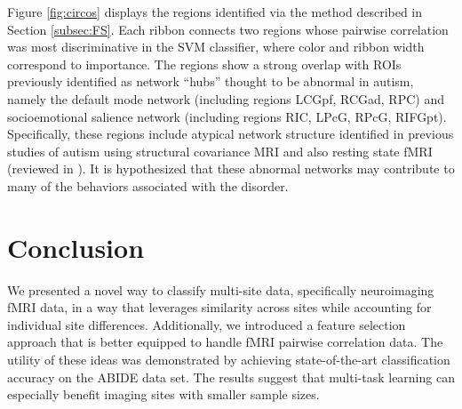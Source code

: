 \documentclass{llncs}
\begin{document}
Figure \ref{fig:circos} displays the regions identified via the method described
in Section \ref{subsec:FS}.  Each ribbon connects two regions whose pairwise
correlation was most discriminative in the SVM classifier, where color and
ribbon width correspond to importance. The regions show a strong overlap with
ROIs previously identified as network ``hubs'' thought to be abnormal in autism,
namely the default mode network (including regions LCGpf, RCGad, RPC) and
socioemotional salience network (including regions RIC, LPcG, RPcG, RIFGpt).
Specifically, these regions include atypical network structure identified in
previous studies of autism using structural covariance MRI
\cite{zielinski2012scmri} and also resting state fMRI (reviewed in
\cite{jeff2014}). It is hypothesized that these abnormal networks may contribute
to many of the behaviors associated with the disorder.

\section{Conclusion}
We presented a novel way to classify multi-site data, specifically neuroimaging
fMRI data, in a way that leverages similarity across sites while accounting for
individual site differences.  Additionally, we introduced a feature selection
approach that is better equipped to handle fMRI pairwise correlation data.  The
utility of these ideas was demonstrated by achieving state-of-the-art
classification accuracy on the ABIDE data set. The results suggest that
multi-task learning can especially benefit imaging sites with smaller sample
sizes.


{}

\end{document}
